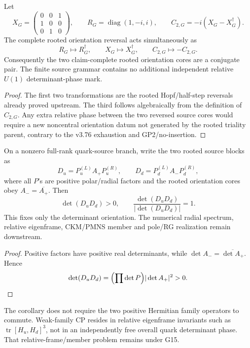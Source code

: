 \documentclass[12pt,a4paper]{article}
\begin{document}
\begin{theorem}
\label{p5:thm:v378-rooted-source-orientation-covariance}
Let
\[
 X_G=\begin{pmatrix}0&0&1\\1&0&0\\0&1&0\end{pmatrix},
 \qquad
 R_G=\operatorname{diag}(1,-i,i),
 \qquad
 C_{2,G}=-i(X_G-X_G^\dagger).
\]
The complete rooted orientation reversal acts simultaneously as
\[
 R_G\longmapsto R_G^\dagger,
 \qquad
 X_G\longmapsto X_G^\dagger,
 \qquad
 C_{2,G}\longmapsto-C_{2,G}.
\]
Consequently the two claim-complete rooted orientation cores are a conjugate
pair.  The finite source grammar contains no additional independent relative
\(U(1)\) determinant-phase mark.
\end{theorem}
\begin{proof}
The first two transformations are the rooted Hopf/half-step reversals already
proved upstream.  The third follows algebraically from the definition of
\(C_{2,G}\).  Any extra relative phase between the two reversed source cores
would require a new noncentral orientation datum not generated by the rooted
triality parent, contrary to the v3.76 exhaustion and GP2/no-insertion.
\end{proof}

\begin{corollary}
\label{p5:cor:v378-quark-determinant-phase-descendant}
On a nonzero full-rank quark-source branch, write the two rooted source blocks
as
\[
 D_u=P_u^{(L)}A_+P_u^{(R)},
 \qquad
 D_d=P_d^{(L)}A_-P_d^{(R)},
\]
where all \(P\)'s are positive polar/radial factors and the rooted orientation
cores obey \(A_-=\overline{A_+}\).  Then
\[
 \boxed{\det(D_uD_d)>0,
 \qquad
 \frac{\det(D_uD_d)}{|\det(D_uD_d)|}=1.}
\]
This fixes only the determinant orientation.  The numerical radial spectrum,
relative eigenframe, CKM/PMNS member and pole/RG realization remain downstream.
\end{corollary}
\begin{proof}
Positive factors have positive real determinants, while
\(\det A_- = \overline{\det A_+}\).  Hence
\[
 \det(D_uD_d)=\Bigl(\prod\det P\Bigr)|\det A_+|^2>0.
\]
\end{proof}

\begin{remark}
\label{p5:rem:v378-weak-cp-separate}
The corollary does not require the two positive Hermitian family operators to
commute.  Weak-family CP resides in relative eigenframe invariants such as
\(\operatorname{tr}[H_u,H_d]^3\), not in an independently free overall quark
determinant phase.  That relative-frame/member problem remains under G15.
\end{remark}
\end{document}
